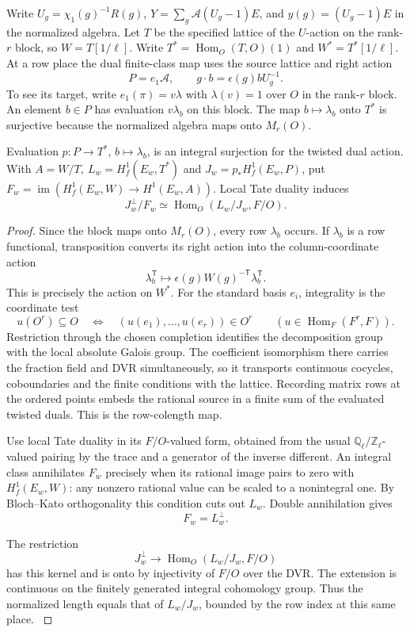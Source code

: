 Write \(U_g=\chi_1(g)^{-1}R(g)\), \(Y=\sum_g\mathcal A(U_g-1)E\),
and \(y(g)=(U_g-1)E\) in the normalized algebra. Let \(T\) be
the specified lattice of the \(U\)-action on the rank-\(r\) block,
so \(W=T[1/\ell]\). Write \(T^*=\operatorname{Hom}_O(T,O)(1)\)
and \(W^*=T^*[1/\ell]\). At a row place the dual finite-class map uses the source lattice and right action
\[
 P=e_1\mathcal A,\qquad g\cdot b=\epsilon(g)bU_g^{-1}.
\]
To see its target, write
\(e_1(\pi)=v\lambda\) with \(\lambda(v)=1\) over \(O\) in the
rank-\(r\) block. An element \(b\in P\) has evaluation \(v\lambda_b\)
on this block. The map \(b\mapsto\lambda_b\) onto \(T^*\) is
surjective because the normalized algebra maps onto \(M_r(O)\).
\begin{lemma}
Evaluation \(p:P\to T^*\), \(b\mapsto\lambda_b\), is an integral
surjection for the twisted dual action. With
\(A=W/T,\ L_w=H^1_f(E_w,T^*)\) and
\(J_w=p_*H^1_f(E_w,P)\), put
\(F_w=\operatorname{im}(H^1_f(E_w,W)\to H^1(E_w,A))\).
Local Tate duality induces
\[
 J_w^\perp/F_w\simeq\operatorname{Hom}_O(L_w/J_w,F/O).
\]
\end{lemma}
\begin{proof}
Since the block maps onto \(M_r(O)\), every row \(\lambda_b\) occurs.
If \(\lambda_b\) is a row functional, transposition converts its right action into the column-coordinate action
\[
 \lambda_b^{\mathsf T}\longmapsto\epsilon(g)W(g)^{-\mathsf T}\lambda_b^{\mathsf T}.
\]
This is precisely the action on \(W^*\). For the standard basis \(e_i\), integrality is the coordinate test
\[
 u(O^r)\subseteq O\quad\Longleftrightarrow\quad
 (u(e_1),\ldots,u(e_r))\in O^r
 \qquad(u\in\operatorname{Hom}_F(F^r,F)).
\] Restriction through the
chosen completion identifies the decomposition group with the
local absolute Galois group. The coefficient isomorphism there
carries the fraction field and DVR simultaneously, so it transports
continuous cocycles, coboundaries and the finite conditions with
the lattice. Recording matrix rows at the ordered points embeds the rational source in a finite sum of the evaluated twisted duals. This is the row-colength map.  \label{cor:split-selmer-3}

Use local Tate duality in its \(F/O\)-valued form, obtained from
the usual \(\mathbb Q_\ell/\mathbb Z_\ell\)-valued pairing by the
trace and a generator of the inverse different. An integral class
annihilates \(F_w\) precisely when its rational image pairs to zero
with \(H^1_f(E_w,W)\): any nonzero rational value can be scaled to
a nonintegral one. By Bloch--Kato orthogonality this condition
cuts out \(L_w\). Double annihilation gives
\[
 F_w=L_w^\perp.
\]

The restriction
\[
 J_w^\perp\to\operatorname{Hom}_O(L_w/J_w,F/O)
\]
has this kernel and is onto by injectivity of \(F/O\) over the DVR.
The extension is continuous on the finitely generated integral
cohomology group. Thus the normalized length equals that of
\(L_w/J_w\), bounded by the row index at this same place.
\cite{bloch-kato}
\end{proof}

